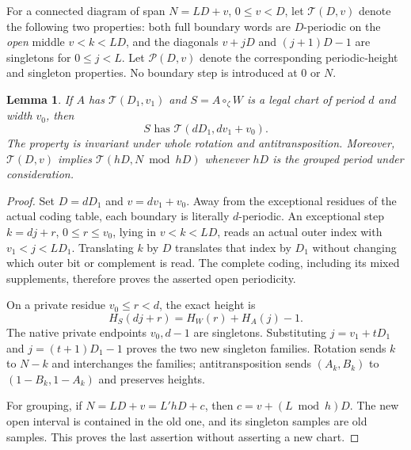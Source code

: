 \documentclass[11pt,a4paper]{amsart}
\numberwithin{equation}{section}
\theoremstyle{plain}
\newtheorem{lemma}[theorem]{Lemma}
\theoremstyle{definition}
\begin{document}
For a connected diagram of span \(N=LD+v\), \(0\le v<D\), let
\(\mathcal T(D,v)\) denote the following two properties: both full boundary
words are \(D\)-periodic on the \emph{open} middle
\(v<k<LD\), and the diagonals \(v+jD\) and \((j+1)D-1\) are singletons for
\(0\le j<L\).  Let \(\mathcal P(D,v)\) denote the corresponding periodic-height
and singleton properties.  No boundary step is introduced at \(0\) or \(N\).

\begin{lemma}\label{lem:propagation}
If \(A\) has \(\mathcal T(D_1,v_1)\) and \(S=A\circ_\zeta W\) is a legal chart
of period \(d\) and width \(v_0\), then
\[
 S\text{ has }\mathcal T(dD_1,dv_1+v_0).
\]
The property is invariant under whole rotation and antitransposition.
Moreover, \(\mathcal T(D,v)\) implies \(\mathcal T(hD,N\bmod hD)\) whenever
\(hD\) is the grouped period under consideration.
\end{lemma}
\begin{proof}
Set \(D=dD_1\) and \(v=dv_1+v_0\).  Away from the exceptional residues of the
actual coding table, each boundary is literally \(d\)-periodic.  An exceptional
step \(k=dj+r\), \(0\le r\le v_0\), lying in \(v<k<LD\), reads an actual outer
index with \(v_1<j<LD_1\).  Translating \(k\) by \(D\) translates that index by
\(D_1\) without changing which outer bit or complement is read.  The complete
coding, including its mixed supplements, therefore proves the asserted
open periodicity.

On a private residue \(v_0\le r<d\), the exact height is
\[
 H_S(dj+r)=H_W(r)+H_A(j)-1.
\]
The native private endpoints \(v_0,d-1\) are singletons.  Substituting
\(j=v_1+tD_1\) and \(j=(t+1)D_1-1\) proves the two new singleton families.
Rotation sends \(k\) to \(N-k\) and interchanges the families; antitransposition
sends \((A_k,B_k)\) to \((1-B_k,1-A_k)\) and preserves heights.

For grouping, if \(N=LD+v=L'hD+c\), then
\(c=v+(L\bmod h)D\).  The new open interval is contained in the old one,
and its singleton samples are old samples.  This proves the last assertion
without asserting a new chart.
\end{proof}
\end{document}
